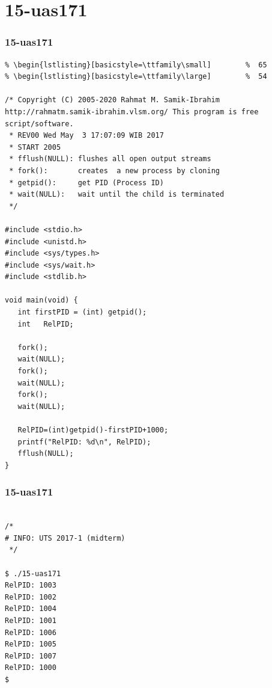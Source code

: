 \documentclass[aspectratio=169, xcolor=table, notheorems, hyperref={pdfpagelabels=false}]{beamer}
\begin{document}
\section{15-uas171}
\begin{frame}[fragile]
\frametitle{15-uas171}
\begin{lstlisting}[basicstyle=\ttfamily\tiny]         % 108
% \begin{lstlisting}[basicstyle=\ttfamily\footnotesize] %  72
% \begin{lstlisting}[basicstyle=\ttfamily\small]        %  65
% \begin{lstlisting}[basicstyle=\ttfamily\large]        %  54

/* Copyright (C) 2005-2020 Rahmat M. Samik-Ibrahim http://rahmatm.samik-ibrahim.vlsm.org/ This program is free script/software. 
 * REV00 Wed May  3 17:07:09 WIB 2017
 * START 2005
 * fflush(NULL): flushes all open output streams
 * fork():       creates  a new process by cloning
 * getpid():     get PID (Process ID)
 * wait(NULL):   wait until the child is terminated
 */

#include <stdio.h>
#include <unistd.h>
#include <sys/types.h>
#include <sys/wait.h>
#include <stdlib.h>

void main(void) {
   int firstPID = (int) getpid();
   int   RelPID;

   fork();
   wait(NULL);
   fork();
   wait(NULL);
   fork();
   wait(NULL);

   RelPID=(int)getpid()-firstPID+1000;
   printf("RelPID: %d\n", RelPID);
   fflush(NULL);
}

\end{lstlisting}
\end{frame}

\begin{frame}[fragile]
\frametitle{15-uas171}
\begin{lstlisting}[basicstyle=\ttfamily\large]        %  54

/*
# INFO: UTS 2017-1 (midterm)
 */

$ ./15-uas171 
RelPID: 1003
RelPID: 1002
RelPID: 1004
RelPID: 1001
RelPID: 1006
RelPID: 1005
RelPID: 1007
RelPID: 1000
$ 


\end{lstlisting}
\end{frame}
\end{document}
